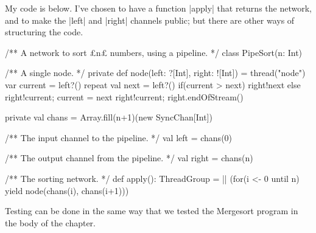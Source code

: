 \begin{answerI}
My code is below.  I've chosen to have a function |apply| that returns the
network, and to make the |left| and |right| channels public; but there are
other ways of structuring the code.
%
\begin{scala}
/** A network to sort £n£ numbers, using a pipeline. */
class PipeSort(n: Int){
  /** A single node. */
  private def node(left: ?[Int], right: ![Int]) = thread("node"){
    var current = left?()
    repeat{
      val next = left?()
      if(current > next) right!next
      else { right!current; current = next }
    }
    right!current; right.endOfStream()
  }

  private val chans = Array.fill(n+1)(new SyncChan[Int])

  /** The input channel to the pipeline. */
  val left = chans(0)

  /** The output channel from the pipeline. */
  val right = chans(n)

  /** The sorting network. */
  def apply(): ThreadGroup =
    || (for(i <- 0 until n) yield node(chans(i), chans(i+1)))
}
\end{scala}

Testing can be done in the same way that we tested the Mergesort program in
the body of the chapter.






\end{answerI}
